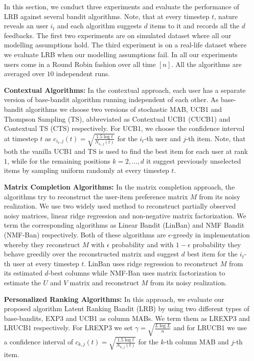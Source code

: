 In this section, we conduct three experiments and evaluate the performance of LRB against several bandit algorithms. Note, that at every timestep $t$, nature reveals an user $i_t$ and each algorithm suggests $d$ items to it and records all the $d$ feedbacks. The first two experiments are on simulated dataset where all our modelling assumptions hold. The third experiment is on a real-life dataset where we evaluate LRB when our modelling assumptions fail. In all our experiments users come in a Round Robin fashion over all time $[n]$. All the algorithms are averaged over $10$ independent runs.

\textbf{Contextual Algorithms:} In the contextual approach, each user has a separate version of base-bandit algorithm running independent of each other. As base-bandit algorithms we choose two versions of stochastic MAB, UCB1 and Thompson Sampling (TS), abbreviated as Contextual UCB1 (CUCB1) and Contextual TS (CTS) respectively. For UCB1, we choose the confidence interval at timestep $t$ as $c_{i_t, j}(t) = \sqrt{\frac{1.5 \log t}{N_{i_t,j}(t)}}$ for the $i_t$-th user and $j$-th item. Note, that both the vanilla UCB1 and TS is used to find the best item for each user at rank $1$, while for the remaining positions $k= 2,\dots, d$ it  suggest previously unselected items by sampling uniform randomly at every timestep $t$. 

\textbf{Matrix Completion Algorithms:} In the matrix completion approach, the algorithms try to reconstruct the user-item preference matrix $M$ from its noisy realization. We use two widely used method to reconstruct partially observed noisy matrices, linear ridge regression and non-negative matrix factorization. We term the corresponding algorithms as Linear Bandit (LinBan) and NMF Bandit (NMF-Ban) respectively. Both of these algorithms are $\epsilon$-greedy in implementation whereby they reconstruct $M$ with $\epsilon$ probability and with $1-\epsilon$ probability they behave greedily over the reconstructed matrix and suggest $d$ best item for the $i_t$-th user at every timestep $t$. LinBan uses ridge regression to reconstruct $M$ from its estimated $d$-best columns while NMF-Ban uses matrix factorization to estimate the $U$ and $V$ matrix and reconstruct $M$ from its noisy realization.

\textbf{Personalized Ranking Algorithms:} In this approach, we evaluate our proposed algorithm Latent Ranking Bandit (LRB) by using two different types of base-bandits, EXP3 and UCB1 as column MABs. We term them as LREXP3 and LRUCB1 respectively. For LREXP3 we set $\gamma = \sqrt{\frac{L \log L}{n}}$ and for LRUCB1 we use  a confidence interval of $c_{k, j}(t) = \sqrt{\frac{1.5 \log t}{N_{k,j}(t)}}$ for the $k$-th column MAB and $j$-th item.

